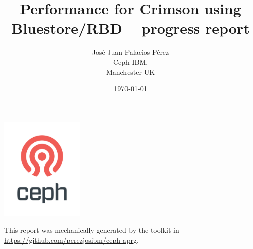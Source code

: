 \title{\textbf{Performance for Crimson using Bluestore/RBD} -- progress report}
\author{Jos\'e Juan Palacios P\'erez\\Ceph IBM,\\Manchester UK}
\date{\today}

\begin{titlepage}
 \begin{minipage}{\textwidth}
   \begin{center}
      \includegraphics[width=0.3\textwidth]{ceph_362px.png}
      \maketitle
   \end{center}
   
   \vspace{0.5cm}
   {\small
   This report was mechanically generated by the toolkit in \url{https://github.com/perezjosibm/ceph-aprg}.}
   \vfill
  \end{minipage}
\end{titlepage}
\tableofcontents
\listoftables
